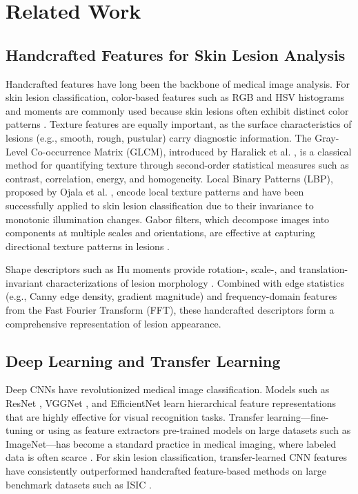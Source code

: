 \documentclass[conference]{IEEEtran}
\begin{document}
\section{Related Work}
\label{sec:related}

\subsection{Handcrafted Features for Skin Lesion Analysis}

Handcrafted features have long been the backbone of medical image
analysis. For skin lesion classification, color-based features such as
RGB and HSV histograms and moments are commonly used because skin
lesions often exhibit distinct color patterns
\cite{abbasi2019dermatologist}. Texture features are equally
important, as the surface characteristics of lesions (e.g., smooth,
rough, pustular) carry diagnostic information. The Gray-Level
Co-occurrence Matrix (GLCM), introduced by Haralick et al.
\cite{haralick1973textural}, is a classical method for quantifying
texture through second-order statistical measures such as contrast,
correlation, energy, and homogeneity. Local Binary Patterns (LBP),
proposed by Ojala et al. \cite{ojala2002multiresolution}, encode
local texture patterns and have been successfully applied to skin
lesion classification due to their invariance to monotonic
illumination changes. Gabor filters, which decompose images into
components at multiple scales and orientations, are effective at
capturing directional texture patterns in lesions
\cite{jain1991unsupervised}.

Shape descriptors such as Hu moments provide rotation-, scale-, and
translation-invariant characterizations of lesion morphology
\cite{hu1962visual}. Combined with edge statistics (e.g., Canny edge
density, gradient magnitude) and frequency-domain features from the
Fast Fourier Transform (FFT), these handcrafted descriptors form a
comprehensive representation of lesion appearance.

\subsection{Deep Learning and Transfer Learning}

Deep CNNs have revolutionized medical image classification. Models
such as ResNet \cite{he2016deep}, VGGNet \cite{simonyan2014very}, and
EfficientNet \cite{tan2019efficientnet} learn hierarchical feature
representations that are highly effective for visual recognition
tasks. Transfer learning---fine-tuning or using as feature extractors
pre-trained models on large datasets such as ImageNet---has become
a standard practice in medical imaging, where labeled data is often
scarce \cite{shin2016deep}. For skin lesion classification,
transfer-learned CNN features have consistently outperformed
handcrafted feature-based methods on large benchmark datasets such as
ISIC \cite{codella2018skin}.
\end{document}

